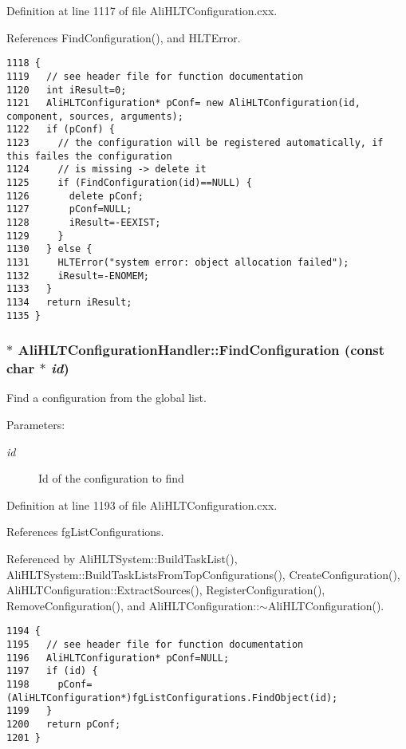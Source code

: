 Definition at line 1117 of file Ali\-HLTConfiguration.cxx.

References Find\-Configuration(), and HLTError.

\footnotesize\begin{verbatim}1118 {
1119   // see header file for function documentation
1120   int iResult=0;
1121   AliHLTConfiguration* pConf= new AliHLTConfiguration(id, component, sources, arguments);
1122   if (pConf) {
1123     // the configuration will be registered automatically, if this failes the configuration
1124     // is missing -> delete it
1125     if (FindConfiguration(id)==NULL) {
1126       delete pConf;
1127       pConf=NULL;
1128       iResult=-EEXIST;
1129     }
1130   } else {
1131     HLTError("system error: object allocation failed");
1132     iResult=-ENOMEM;
1133   }
1134   return iResult;
1135 }
\end{verbatim}\normalsize 


\subsubsection{ $\ast$ Ali\-HLTConfiguration\-Handler::Find\-Configuration (const char $\ast$ {\em id})}\label{classAliHLTConfigurationHandler_a6}


Find a configuration from the global list. \begin{Desc}
\item[Parameters:]
\begin{description}
\item[{\em id}]Id of the configuration to find \end{description}
\end{Desc}


Definition at line 1193 of file Ali\-HLTConfiguration.cxx.

References fg\-List\-Configurations.

Referenced by Ali\-HLTSystem::Build\-Task\-List(), Ali\-HLTSystem::Build\-Task\-Lists\-From\-Top\-Configurations(), Create\-Configuration(), Ali\-HLTConfiguration::Extract\-Sources(), Register\-Configuration(), Remove\-Configuration(), and Ali\-HLTConfiguration::$\sim$Ali\-HLTConfiguration().

\footnotesize\begin{verbatim}1194 {
1195   // see header file for function documentation
1196   AliHLTConfiguration* pConf=NULL;
1197   if (id) {
1198     pConf=(AliHLTConfiguration*)fgListConfigurations.FindObject(id); 
1199   }
1200   return pConf;
1201 }
\end{verbatim}\normalsize 


